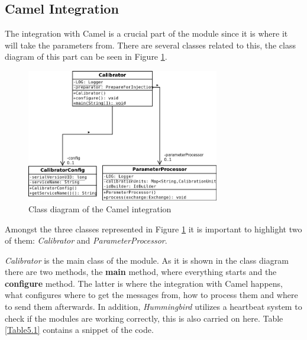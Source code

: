 \subsection{Camel Integration}

The integration with Camel is a crucial part of the module since it is where it will take the parameters from. There are several classes related to this, the class diagram of this part can be seen in Figure \ref{f5.1}. 

\begin{figure}[H]
\centerline{\includegraphics[width=0.75\textwidth]{images/CalibratorCamelClassDiagram.png}}
\caption{Class diagram of the Camel integration}
\label{f5.1}
\end{figure}

Amongst the three classes represented in Figure \ref{f5.1} it is important to highlight two of them: \emph{Calibrator} and \emph{ParameterProcessor}.

\emph{Calibrator} is the main class of the module. As it is shown in the class diagram there are two methods, the \textbf{main} method, where everything starts and the \textbf{configure} method. The latter is where the integration with Camel happens, what configures where to get the messages from, how to process them and where to send them afterwards. In addition, \emph{Hummingbird} utilizes a heartbeat system to check if the modules are working correctly, this is also carried on here. Table \ref{Table5.1} contains a snippet of the code.

